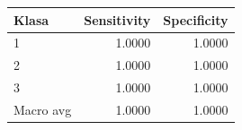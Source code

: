 \begin{tabular}{lrr}
\hline
Klasa & Sensitivity & Specificity \\
\hline
1 & 1.0000 & 1.0000 \\
2 & 1.0000 & 1.0000 \\
3 & 1.0000 & 1.0000 \\
\hline
Macro avg & 1.0000 & 1.0000 \\
\hline
\end{tabular}